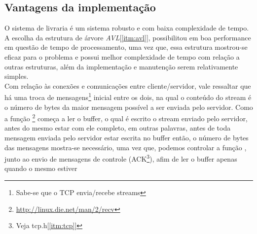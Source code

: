 \documentclass[a4paper,10pt]{article}
\begin{document}
\subsection{Vantagens da implementação}
O sistema de livraria é um sistema robusto e com baixa complexidade de tempo.
A escolha da estrutura de árvore \textit{AVL}[\ref{itm:avl}], possibilitou em boa 
performance em questão de tempo de processamento, uma vez que, essa estrutura
mostrou-se eficaz para o problema e possui melhor complexidade de tempo com 
relação a outras estruturas, além da implementação e manutenção serem relativamente	
simples.
\\ Com relação às conexões e comunicações entre cliente/servidor, vale ressaltar
que há uma troca de mensagens\footnote{Sabe-se que o TCP envia/recebe streams}
inicial entre os dois, na qual o conteúdo do stream é o número de bytes da maior
mensagem possível a ser enviada pelo servidor.
Como a função \footnote{\url{http://linux.die.net/man/2/recv}} começa a ler o buffer, o
qual é escrito o stream enviado pelo servidor, antes do mesmo estar com ele
completo, em outras palavras, antes de toda mensagem enviada pelo servidor estar
escrita no buffer então, o número de bytes das mensagens mostra-se necessário,
uma vez que, podemos controlar a função , junto ao envio de mensagens de controle (ACK\footnote{Veja
tcp.h[\ref{itm:tcp}]}), afim de ler o buffer apenas quando o mesmo estiver
\end{document}
